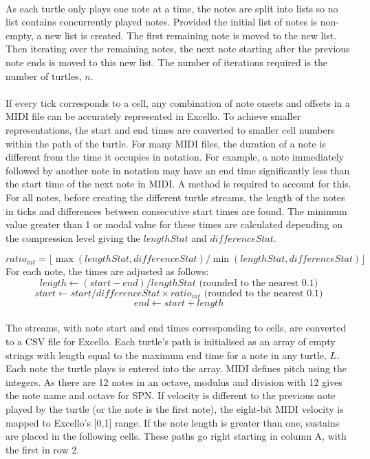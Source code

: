 \paragraph{} As each turtle only plays one note at a time, the notes are split into lists so no list contains concurrently played notes. Provided the initial list of notes is non-empty, a new list is created. The first remaining note is moved to the new list. Then iterating over the remaining notes, the next note starting after the previous note ends is moved to this new list. The number of iterations required is the number of turtles, $n$.

\paragraph{} If every tick corresponds to a cell, any combination of note onsets and offsets in a MIDI file can be accurately represented in Excello. To achieve smaller representations, the start and end times are converted to smaller cell numbers within the path of the turtle. For many MIDI files, the duration of a note is different from the time it occupies in notation. For example, a note immediately followed by another note in notation may have an end time significantly less than the start time of the next note in MIDI. A method is required to account for this. For all notes, before creating the different turtle streams, the length of the notes in ticks and differences between consecutive start times are found. The minimum value greater than 1 or modal value for these times are calculated depending on the compression level giving the $lengthStat$ and $differenceStat$.
\vspace{-10pt}

  $$ratio_{int} = \lfloor\max(lengthStat, differenceStat)/\min(lengthStat, differenceStat)\rfloor$$
For each note, the times are adjusted as follows:
  $$length \gets (start - end) / lengthStat \text{ (rounded to the nearest 0.1)}$$
  $$start \gets start / differenceStat \times ratio_{int} \text{ (rounded to the nearest 0.1)}$$
  $$end \gets start +length$$

\paragraph{} The streams, with note start and end times corresponding to cells, are converted to a CSV file for Excello. Each turtle's path is initialised as an array of empty strings with length equal to the maximum end time for a note in any turtle, $L$.  Each note the turtle plays is entered into the array. MIDI defines pitch using the integers. As there are 12 notes in an octave, modulus and division with 12 gives the note name and octave for SPN. If velocity is different to the previous note played by the turtle (or the note is the first note), the eight-bit MIDI velocity is mapped to Excello's [0,1] range. If the note length is greater than one, sustains are placed in the following cells. These paths go right starting in column A, with the first in row 2.

